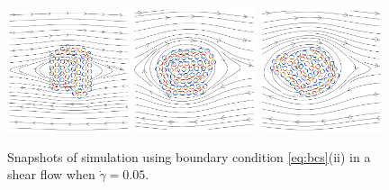 \documentclass[aps,prl,preprint,groupedaddress]{revtex4-2}
\begin{document}
%
%
\begin{figure}
  \begin{center}
  \includegraphics[width=0.32\textwidth]{shear_0.png}
  \includegraphics[width=0.32\textwidth]{shear_1000.png}
  \includegraphics[width=0.32\textwidth]{shear_2000.png} 
  \end{center}
  \vspace{-20pt}  
  \caption{\label{fig:shear_1} Snapshots of simulation using boundary condition \eqref{eq:bcs}(ii) in a shear flow when $\dot\gamma=0.05$. }
\end{figure}
%
\end{document}
